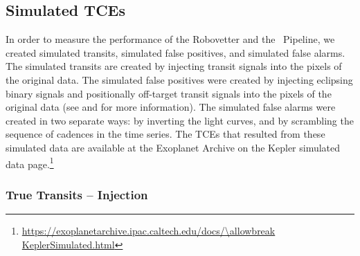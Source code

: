 \subsection{Simulated TCEs}
\label{s:simulated}
In order to measure the performance of the Robovetter and the \Kepler\ Pipeline, we created simulated transits, simulated false positives, and simulated false alarms. The simulated transits are created by injecting transit signals into the pixels of the original data. The simulated false positives were created by injecting eclipsing binary signals and positionally off-target transit signals into the pixels of the original data (see \citealt{Coughlin2017a} and \citealt{Christiansen2017} for more information). The simulated false alarms were created in two separate ways: by inverting the light curves, and by scrambling the sequence of cadences in the time series. The TCEs that resulted from these simulated data are available at the Exoplanet Archive on the Kepler simulated data page.\footnote{\label{kepsimpagefn}\url{https://exoplanetarchive.ipac.caltech.edu/docs/\allowbreak KeplerSimulated.html}}


\subsubsection{True Transits -- Injection}
\label{injectsec}

